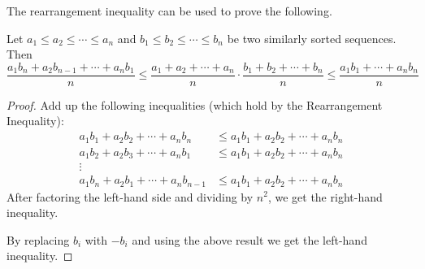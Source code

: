 The rearrangement inequality can be used to prove the following.
\begin{thm}[Chebyshev]
Let $a_1\leq a_2\leq \cdots \leq a_n$ and $b_1\leq b_2\leq \cdots \leq b_n$ be two similarly sorted sequences. Then
\[
\frac{a_1b_n+a_2b_{n-1}+\cdots +a_nb_1}{n}\leq \frac{a_1+a_2+\cdots +a_n}{n}\cdot \frac{b_1+b_2+\cdots+b_n}{n}\leq\frac{a_1b_1+\cdots+a_nb_n}{n} 
\]
\end{thm}
\begin{proof}
Add up the following inequalities (which hold by the Rearrangement Inequality):
\begin{align*}
a_1b_1+a_2b_2+\cdots+a_nb_n&\leq a_1b_1+a_2b_2+\cdots+a_nb_n\\
a_1b_2+a_2b_3+\cdots +a_nb_1&\leq a_1b_1+a_2b_2+\cdots+a_nb_n\\
\vdots\\
a_1b_n+a_2b_1+\cdots +a_nb_{n-1}&\leq a_1b_1+a_2b_2+\cdots+a_nb_n
\end{align*}
After factoring the left-hand side and dividing by $n^2$, we get the right-hand inequality. 

By replacing $b_i$ with $-b_i$ and using the above result we get the left-hand inequality.
\end{proof}
